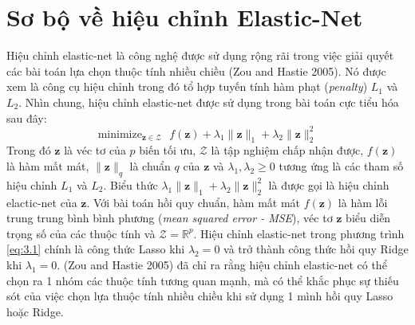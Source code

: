 \section{Sơ bộ về hiệu chỉnh Elastic-Net}
Hiệu chỉnh elastic-net là công nghệ được sử dụng rộng rãi trong việc giải quyết 
các bài toán lựa chọn thuộc tính nhiều chiều (Zou and Hastie 2005). Nó được xem 
là công cụ hiệu chỉnh trong đó tổ hợp tuyến tính hàm phạt (\textit{penalty})
$L_1$ và $L_2$. Nhìn chung, hiệu chỉnh elastic-net được sử dụng trong bài toán cực 
tiểu hóa sau đây:
\begin{equation}
    \label{eq:3.1}
    \text{minimize}_{\mathbf{z} \in \mathcal{Z}} \text{ }
    f(\mathbf{z}) + \lambda_1 \lVert \mathbf{z} \rVert_1
    + \lambda_2 \lVert \mathbf{z} \rVert_2^2
\end{equation}
Trong đó $\mathbf{z}$ là véc tơ của $p$ biến tối ưu, $\mathcal{Z}$ là tập nghiệm 
chấp nhận được, $f(\mathbf{z})$ là hàm mất mát, $\lVert \mathbf{z} \rVert_q$ là 
chuẩn $q$ của $\mathbf{z}$ và $\lambda_1, \lambda_2 \geq 0$ tương ứng là các tham số hiệu 
chỉnh $L_1$ và $L_2$. Biểu thức $\lambda_1 \lVert \mathbf{z} \rVert_1 + \lambda_2 
\lVert \mathbf{z} \rVert_2^2$ là được gọi là hiệu chỉnh elactic-net của $\mathbf{z}$.
Với bài toán hồi quy chuẩn, hàm mất mát $f(\mathbf{z})$ là hàm lỗi trung trung bình
bình phương (\textit{mean squared error - MSE}), véc tơ $\mathbf{z}$ biểu diễn trọng 
số của các thuộc tính và $\mathcal{Z} = \mathbb{R}^p$. Hiệu chỉnh elastic-net trong 
phương trình \ref{eq:3.1} chính là công thức Lasso khi $\lambda_2 = 0$ và trở thành công 
thức hồi quy Ridge khi $\lambda_1 = 0$. (Zou and Hastie 2005) đã chỉ ra rằng hiệu chỉnh 
elastic-net có thể chọn ra 1 nhóm các thuộc tính tương quan mạnh, mà có thể khắc phục sự 
thiếu sót của việc chọn lựa thuộc tính nhiều chiều khi sử dụng 1 mình hồi quy Lasso 
hoặc Ridge.